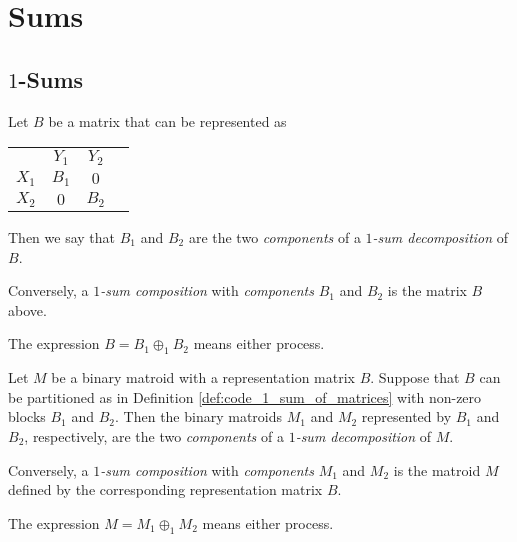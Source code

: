 \section{Sums}

\subsection{$1$-Sums}

\begin{definition}
  \label{def:code_1_sum_of_matrices}
  Let $B$ be a matrix that can be represented as
  \begin{tabular}{cccc}
                                 & $Y_{1}$                      & $Y_{2}$                      &  \\ \cline{2-3}
    \multicolumn{1}{c|}{$X_{1}$} & \multicolumn{1}{c|}{$B_{1}$} & \multicolumn{1}{c|}{    $0$} &  \\ \cline{2-3}
    \multicolumn{1}{c|}{$X_{2}$} & \multicolumn{1}{c|}{    $0$} & \multicolumn{1}{c|}{$B_{2}$} &  \\ \cline{2-3}
  \end{tabular}
  Then we say that $B_{1}$ and $B_{2}$ are the two \emph{components} of a \emph{$1$-sum decomposition} of $B$.

  Conversely, a \emph{$1$-sum composition} with \emph{components} $B_{1}$ and $B_{2}$ is the matrix $B$ above.

  The expression $B = B_{1} \oplus_{1} B_{2}$ means either process.
\end{definition}

\begin{definition}
  \label{def:code_1_sum_of_binary}
  Let $M$ be a binary matroid with a representation matrix $B$.
  Suppose that $B$ can be partitioned as in Definition \ref{def:code_1_sum_of_matrices} with non-zero blocks $B_{1}$ and $B_{2}$.
  Then the binary matroids $M_{1}$ and $M_{2}$ represented by $B_{1}$ and $B_{2}$, respectively, are the two \emph{components} of a \emph{$1$-sum decomposition} of $M$.

  Conversely, a \emph{$1$-sum composition} with \emph{components} $M_{1}$ and $M_{2}$ is the matroid $M$ defined by the corresponding representation matrix $B$.

  The expression $M = M_{1} \oplus_{1} M_{2}$ means either process.
\end{definition}

